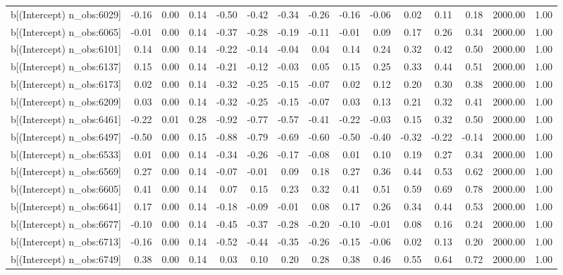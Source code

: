 \begin{table}[ht]
\begin{tabular}{rrrrrrrrrrrrrrr}
  b[(Intercept) n\_obs:6029] & -0.16 & 0.00 & 0.14 & -0.50 & -0.42 & -0.34 & -0.26 & -0.16 & -0.06 & 0.02 & 0.11 & 0.18 & 2000.00 & 1.00 \\ 
  b[(Intercept) n\_obs:6065] & -0.01 & 0.00 & 0.14 & -0.37 & -0.28 & -0.19 & -0.11 & -0.01 & 0.09 & 0.17 & 0.26 & 0.34 & 2000.00 & 1.00 \\ 
  b[(Intercept) n\_obs:6101] & 0.14 & 0.00 & 0.14 & -0.22 & -0.14 & -0.04 & 0.04 & 0.14 & 0.24 & 0.32 & 0.42 & 0.50 & 2000.00 & 1.00 \\ 
  b[(Intercept) n\_obs:6137] & 0.15 & 0.00 & 0.14 & -0.21 & -0.12 & -0.03 & 0.05 & 0.15 & 0.25 & 0.33 & 0.44 & 0.51 & 2000.00 & 1.00 \\ 
  b[(Intercept) n\_obs:6173] & 0.02 & 0.00 & 0.14 & -0.32 & -0.25 & -0.15 & -0.07 & 0.02 & 0.12 & 0.20 & 0.30 & 0.38 & 2000.00 & 1.00 \\ 
  b[(Intercept) n\_obs:6209] & 0.03 & 0.00 & 0.14 & -0.32 & -0.25 & -0.15 & -0.07 & 0.03 & 0.13 & 0.21 & 0.32 & 0.41 & 2000.00 & 1.00 \\ 
  b[(Intercept) n\_obs:6461] & -0.22 & 0.01 & 0.28 & -0.92 & -0.77 & -0.57 & -0.41 & -0.22 & -0.03 & 0.15 & 0.32 & 0.50 & 2000.00 & 1.00 \\ 
  b[(Intercept) n\_obs:6497] & -0.50 & 0.00 & 0.15 & -0.88 & -0.79 & -0.69 & -0.60 & -0.50 & -0.40 & -0.32 & -0.22 & -0.14 & 2000.00 & 1.00 \\ 
  b[(Intercept) n\_obs:6533] & 0.01 & 0.00 & 0.14 & -0.34 & -0.26 & -0.17 & -0.08 & 0.01 & 0.10 & 0.19 & 0.27 & 0.34 & 2000.00 & 1.00 \\ 
  b[(Intercept) n\_obs:6569] & 0.27 & 0.00 & 0.14 & -0.07 & -0.01 & 0.09 & 0.18 & 0.27 & 0.36 & 0.44 & 0.53 & 0.62 & 2000.00 & 1.00 \\ 
  b[(Intercept) n\_obs:6605] & 0.41 & 0.00 & 0.14 & 0.07 & 0.15 & 0.23 & 0.32 & 0.41 & 0.51 & 0.59 & 0.69 & 0.78 & 2000.00 & 1.00 \\ 
  b[(Intercept) n\_obs:6641] & 0.17 & 0.00 & 0.14 & -0.18 & -0.09 & -0.01 & 0.08 & 0.17 & 0.26 & 0.34 & 0.44 & 0.53 & 2000.00 & 1.00 \\ 
  b[(Intercept) n\_obs:6677] & -0.10 & 0.00 & 0.14 & -0.45 & -0.37 & -0.28 & -0.20 & -0.10 & -0.01 & 0.08 & 0.16 & 0.24 & 2000.00 & 1.00 \\ 
  b[(Intercept) n\_obs:6713] & -0.16 & 0.00 & 0.14 & -0.52 & -0.44 & -0.35 & -0.26 & -0.15 & -0.06 & 0.02 & 0.13 & 0.20 & 2000.00 & 1.00 \\ 
  b[(Intercept) n\_obs:6749] & 0.38 & 0.00 & 0.14 & 0.03 & 0.10 & 0.20 & 0.28 & 0.38 & 0.46 & 0.55 & 0.64 & 0.72 & 2000.00 & 1.00 \\ 

\end{tabular}
\end{table}
